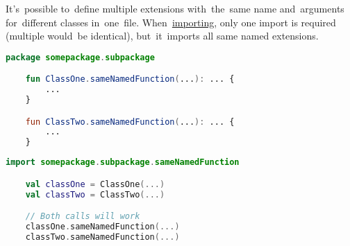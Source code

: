 \noindent It's~possible to~define multiple extensions with~the~same name and~arguments for~different classes in~one~file.
When~\hyperref[kotlinextensionscope]{importing}, only one import is required (multiple would~be identical), but~it~imports all same named extensions.

\example
\begin{lstlisting}[language=Kotlin, title={Same named extensions for different classes}]
    package somepackage.subpackage

    fun ClassOne.sameNamedFunction(...): ... {
        ...
    }

    fun ClassTwo.sameNamedFunction(...): ... {
        ...
    }
\end{lstlisting}
\begin{lstlisting}[language=Kotlin, title={Usage}]
    import somepackage.subpackage.sameNamedFunction

    val classOne = ClassOne(...)
    val classTwo = ClassTwo(...)

    // Both calls will work
    classOne.sameNamedFunction(...)
    classTwo.sameNamedFunction(...)
\end{lstlisting}
\newpage

